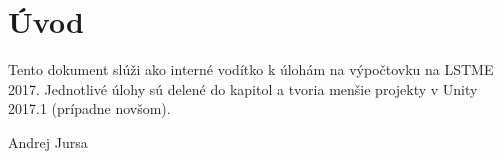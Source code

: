 \chapter*{Úvod}\label{chp:uvod}

Tento dokument slúži ako interné vodítko k úlohám na výpočtovku na LSTME 2017. Jednotlivé úlohy sú delené do kapitol a tvoria menšie projekty v Unity 2017.1 (prípadne novšom).

\begin{flushright}
	Andrej Jursa
\end{flushright}